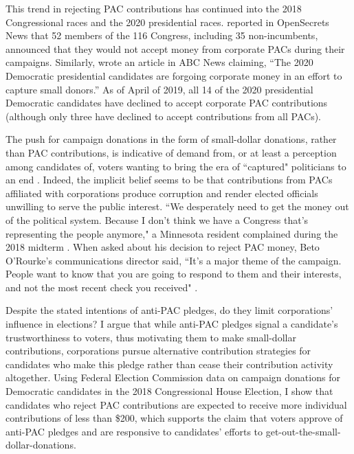 \documentclass[12pt]{article}
\begin{document}
This trend in rejecting PAC contributions has continued into the 2018 Congressional races and the 2020 presidential races. \citet{evers-hillstrom2018} reported in OpenSecrets News that 52 members of the 116 Congress, including 35 non-incumbents, announced that they would not accept money from corporate PACs during their campaigns. Similarly,  \citeyearpar{harper2019} wrote an article in ABC News claiming, ``The 2020 Democratic presidential candidates are forgoing corporate money in an effort to capture small donors.'' As of April of 2019, all 14 of the 2020 presidential Democratic candidates have declined to accept corporate PAC contributions (although only three have declined to accept contributions from all PACs). 

The push for campaign donations in the form of small-dollar donations, rather than PAC contributions, is indicative of demand from, or at least a perception among candidates of, voters wanting to bring the era of ``captured" politicians to an end \citep{culberson2019}. Indeed, the implicit belief seems to be that contributions from PACs affiliated with corporations produce corruption and render elected officials unwilling to serve the public interest. ``We desperately need to get the money out of the political system. Because I don’t think we have a Congress that’s representing the people anymore," a Minnesota resident complained during the 2018 midterm \citep{stockman2018}. When asked about his decision to reject PAC money, Beto O’Rourke's communications director said, ``It’s a major theme of the campaign. People want to know that you are going to respond to them and their interests, and not the most recent check you received" \citep{stockman2018}. 

Despite the stated intentions of anti-PAC pledges, do they limit corporations' influence in elections? I argue that while anti-PAC pledges signal a candidate's trustworthiness to voters, thus motivating them to make small-dollar contributions, corporations pursue alternative contribution strategies for candidates who make this pledge rather than cease their contribution activity altogether. Using Federal Election Commission data on campaign donations for Democratic candidates in the 2018 Congressional House Election, I show that candidates who reject PAC contributions are expected to receive more individual contributions of less than \$200, which supports the claim that voters approve of anti-PAC pledges and are responsive to candidates' efforts to get-out-the-small-dollar-donations. 
\end{document}
